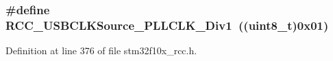 \subsubsection[{\texorpdfstring{R\+C\+C\+\_\+\+U\+S\+B\+C\+L\+K\+Source\+\_\+\+P\+L\+L\+C\+L\+K\+\_\+\+Div1}{RCC_USBCLKSource_PLLCLK_Div1}}]{\setlength{\rightskip}{0pt plus 5cm}\#define R\+C\+C\+\_\+\+U\+S\+B\+C\+L\+K\+Source\+\_\+\+P\+L\+L\+C\+L\+K\+\_\+\+Div1~(({\bf uint8\+\_\+t})0x01)}\hypertarget{group___u_s_b___device__clock__source_ga8162727793b5690d6b96ad0cc7ce3866}{}\label{group___u_s_b___device__clock__source_ga8162727793b5690d6b96ad0cc7ce3866}


Definition at line 376 of file stm32f10x\+\_\+rcc.\+h.

